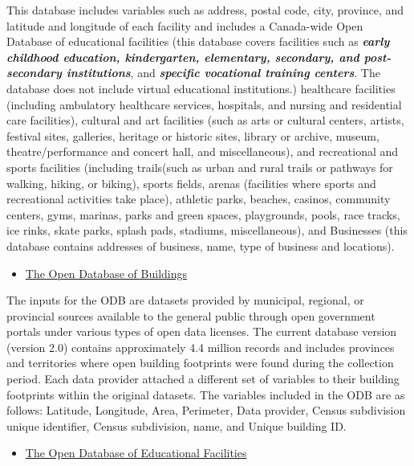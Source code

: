\documentclass[12pt,twoside]{reedthesis}
\providecommand{\tightlist}{%
  \setlength{\itemsep}{0pt}\setlength{\parskip}{0pt}}
\begin{document}
This database includes variables such as address, postal code, city, province, and latitude and longitude of each facility and includes a Canada-wide Open Database of educational facilities (this database covers facilities such as \textbf{\emph{early childhood education, kindergarten, elementary, secondary, and post-secondary institutions}}, and \textbf{\emph{specific vocational training centers}}. The database does not include virtual educational institutions.) healthcare facilities (including ambulatory healthcare services, hospitals, and nursing and residential care facilities), cultural and art facilities (such as arts or cultural centers, artists, festival sites, galleries, heritage or historic sites, library or archive, museum, theatre/performance and concert hall, and miscellaneous), and recreational and sports facilities (including trails(such as urban and rural trails or pathways for walking, hiking, or biking), sports fields, arenas (facilities where sports and recreational activities take place), athletic parks, beaches, casinos, community centers, gyms, marinas, parks and green spaces, playgrounds, pools, race tracks, ice rinks, skate parks, splash pads, stadiums, miscellaneous), and Businesses (this database contains addresses of business, name, type of business and locations).
\begin{itemize}
\tightlist
\item
  \href{https://www.statcan.gc.ca/en/lode/databases/odb}{The Open Database of Buildings}
\end{itemize}
The inputs for the ODB are datasets provided by municipal, regional, or provincial sources available to the general public through open government portals under various types of open data licenses. The current database version (version 2.0) contains approximately 4.4 million records and includes provinces and territories where open building footprints were found during the collection period. Each data provider attached a different set of variables to their building footprints within the original datasets. The variables included in the ODB are as follows: Latitude, Longitude, Area, Perimeter, Data provider, Census subdivision unique identifier, Census subdivision, name, and Unique building ID.
\begin{itemize}
\tightlist
\item
  \href{https://www.statcan.gc.ca/en/lode/databases/odef}{The Open Database of Educational Facilities}
\end{itemize}
\end{document}
